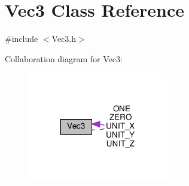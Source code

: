 \hypertarget{classVec3}{}\section{Vec3 Class Reference}
\label{classVec3}


{\ttfamily \#include $<$Vec3.\+h$>$}



Collaboration diagram for Vec3\+:
\nopagebreak
\begin{figure}[H]
\begin{center}
\leavevmode
\includegraphics[width=174pt]{classVec3__coll__graph}
\end{center}
\end{figure}
